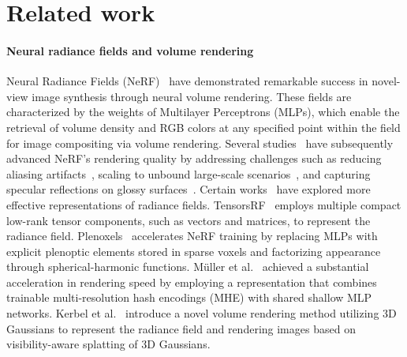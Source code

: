 \section{Related work}
\paragraph{Neural radiance fields and volume rendering}
Neural Radiance Fields (NeRF)~\cite{mildenhall2020nerf} have demonstrated remarkable success in novel-view image synthesis through neural volume rendering. These fields are characterized by the weights of Multilayer Perceptrons (MLPs), which enable the retrieval of volume density and RGB colors at any specified point within the field for image compositing via volume rendering. Several studies~\cite{barron2021mip,barron2022mip,verbin2022ref,chen2022tensorf,fridovich2022plenoxels} have subsequently advanced NeRF's rendering quality by addressing challenges such as reducing aliasing artifacts~\cite{barron2021mip}, scaling to unbound large-scale scenarios~\cite{barron2022mip}, and capturing specular reflections on glossy surfaces~\cite{verbin2022ref}.
Certain works~\cite{chen2022tensorf,fridovich2022plenoxels,mueller2022instant,kerbl20233d} have explored more effective representations of radiance fields. TensorsRF~\cite{chen2022tensorf} employs multiple compact low-rank tensor components, such as vectors and matrices, to represent the radiance field. Plenoxels~\cite{fridovich2022plenoxels} accelerates NeRF training by replacing MLPs with explicit plenoptic elements stored in sparse voxels and factorizing appearance through spherical-harmonic functions.
M\"uller et al.~\cite{mueller2022instant} achieved a substantial acceleration in rendering speed by employing a representation that combines trainable multi-resolution hash encodings (MHE) with shared shallow MLP networks. Kerbel et al.~\cite{kerbl20233d} introduce a novel volume rendering method utilizing 3D Gaussians to represent the radiance field and rendering images based on visibility-aware splatting of 3D Gaussians.



